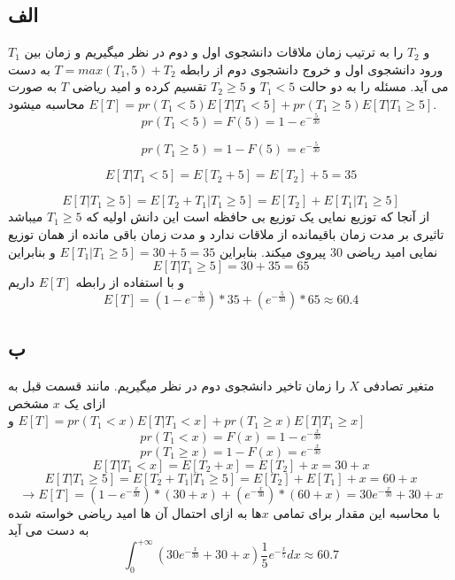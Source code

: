 \subsection*{الف}
$T_1$ و $T_2$ را به ترتیب زمان ملاقات دانشجوی اول و دوم در نظر میگیریم و زمان بین ورود دانشجوی اول و خروج دانشجوی دوم از رابطه $T = max(T_1,5) + T_2$ به دست می آید. مسئله را به دو حالت $T_1 < 5$ و $T_2 \geq 5$ تقسیم کرده و امید ریاضی $T$ به صورت $E[T] = pr(T_1 < 5)E[T|T_1 < 5] + pr(T_1 \geq 5)E[T|T_1 \geq 5]$ محاسبه میشود.\\

$$pr(T_1 < 5) = F(5) = 1 - e^{-\frac{5}{30}}$$

$$pr(T_1 \geq 5) = 1 - F(5) = e^{-\frac{5}{30}}$$

$$E[T|T_1 < 5] = E[T_2 + 5] = E[T_2] + 5 = 35$$

$$E[T|T_1 \geq 5] = E[T_2 + T_1 | T_1 \geq 5] = E[T_2] +  E[T_1| T_1 \geq 5]$$
 از آنجا که توزیع نمایی یک توزیع بی حافظه است این دانش اولیه که $T_1 \geq 5$ میباشد تاثیری بر مدت زمان باقیمانده از ملاقات ندارد و مدت زمان باقی مانده از همان توزیع نمایی امید ریاضی 30 پیروی میکند. بنابراین $E[T_1| T_1 \geq 5] = 30 +5 = 35$ و بنابراین\\
$$E[T|T_1 \geq 5] = 30 + 35 = 65$$
و با استفاده از رابطه $E[T]$ داریم \\
$$E[T] = (1 - e^{-\frac{5}{30}}) * 35 +  (e^{-\frac{5}{30}}) * 65 \approx 60.4 $$

\subsection*{ب}
متغیر تصادفی $X$ را زمان تاخیر دانشجوی دوم در نظر میگیریم. مانند قسمت قبل به ازای یک $x$ مشخص $E[T] = pr(T_1 < x)E[T|T_1 < x] + pr(T_1 \geq x)E[T|T_1 \geq x]$ و\\ 
$$pr(T_1 < x) = F(x) = 1 - e^{-\frac{x}{30}}$$
$$pr(T_1 \geq x) = 1 - F(x) = e^{-\frac{x}{30}}$$
$$E[T|T_1 < x] = E[T_2 + x] = E[T_2] + x = 30 + x$$
$$E[T|T_1 \geq 5] = E[T_2 + T_1 | T_1 \geq 5] = E[T_2] +  E[T_1] + x = 60 + x$$
$$\rightarrow E[T] = (1 - e^{-\frac{x}{30}}) * (30+x) +  (e^{-\frac{x}{30}}) * (60+x) = 30e^{-\frac{x}{30}} + 30 + x$$
با محاسبه این مقدار برای تمامی $x$ها به ازای احتمال آن ها امید ریاضی خواسته شده به دست می آید\\ 
$$\int_0^{+\infty} (30e^{-\frac{x}{30}} + 30 + x)\frac{1}{5}e^{-\frac{x}{5}}dx \approx 60.7 $$

